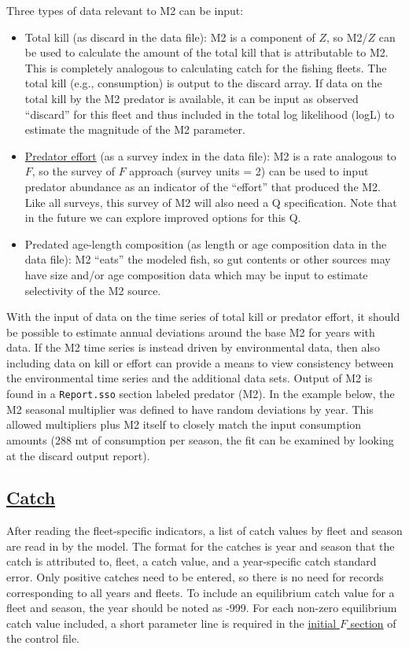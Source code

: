 Three types of data relevant to M2 can be input:

\begin{itemize}
	\item Total kill (as discard in the data file): M2 is a component of $Z$, so M2/$Z$ can be used to calculate the amount of the total kill that is attributable to M2. This is completely analogous to calculating catch for the fishing fleets. The total kill (e.g., consumption) is output to the discard array. If data on the total kill by the M2 predator is available, it can be input as observed ``discard'' for this fleet and thus included in the total log likelihood (logL) to estimate the magnitude of the M2 parameter.
	
	\item \hyperlink{PredEffort}{Predator effort} (as a survey index in the data file): M2 is a rate analogous to $F$, so the survey of $F$ approach (survey units = 2) can be used to input predator abundance as an indicator of the ``effort'' that produced the M2. Like all surveys, this survey of M2 will also need a Q specification. Note that in the future we can explore improved options for this Q.
	
	\item Predated age-length composition (as length or age composition data in the data file): M2 ``eats'' the modeled fish, so gut contents or other sources may have size and/or age composition data which may be input to estimate selectivity of the M2 source. 
\end{itemize}

With the input of data on the time series of total kill or predator effort, it should be possible to estimate annual deviations around the base M2 for years with data. If the M2 time series is instead driven by environmental data, then also including data on kill or effort can provide a means to view consistency between the environmental time series and the additional data sets. Output of M2 is found in a \texttt{Report.sso} section labeled predator (M2). In the example below, the M2 seasonal multiplier was defined to have random deviations by year. This allowed multipliers plus M2 itself to closely match the input consumption amounts (288 mt of consumption per season, the fit can be examined by looking at the discard output report).

\hyperlink{Catch}{}
\subsection[Catch]{\protect\hyperlink{Catch}{Catch}}
\hypertarget{CatchFormat}{}
After reading the fleet-specific indicators, a list of catch values by fleet and season are read in by the model. The format for the catches is year and season that the catch is attributed to, fleet, a catch value, and a year-specific catch standard error. Only positive catches need to be entered, so there is no need for records corresponding to all years and fleets. To include an equilibrium catch value for a fleet and season, the year should be noted as -999. For each non-zero equilibrium catch value included, a short parameter line is required in the \hyperlink{InitF}{initial $F$ section} of the control file.

